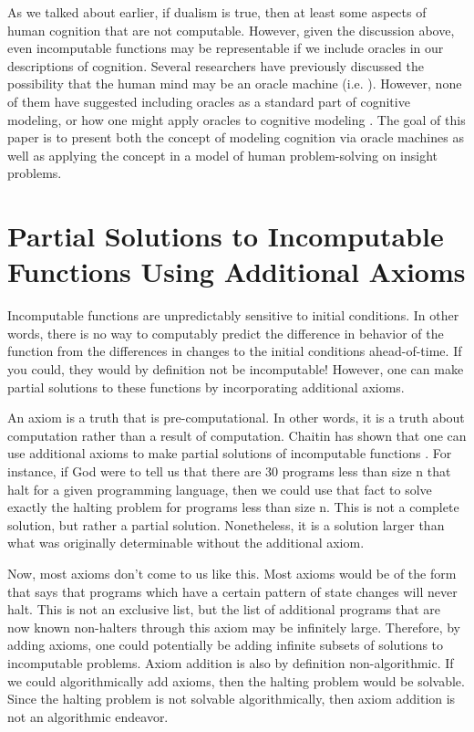 As we talked about earlier, if dualism is true, then at least some aspects of human cognition that are not computable.  However, given the discussion above, even incomputable functions may be representable if we include oracles in our descriptions of cognition.  Several researchers have previously discussed the possibility that the human mind may be an oracle machine (i.e. \citet{copeland1998}).  However, none of them have suggested including oracles as a standard part of cognitive modeling, or how one might apply oracles to cognitive modeling \citep{bartlett2010a, bartlett2010b}. The goal of this paper is to present both the concept of modeling cognition via oracle machines as well as applying the concept in a model of human problem-solving on insight problems.

\section[Partial Solutions to Incomputable Functions]{Partial Solutions to Incomputable Functions Using Additional Axioms}

Incomputable functions are unpredictably sensitive to initial conditions.  In other words, there is no way to computably predict the difference in behavior of the function from the differences in changes to the initial conditions ahead-of-time.  If you could, they would by definition not be incomputable!  However, one can make partial solutions to these functions by incorporating additional axioms.

An axiom is a truth that is pre-computational.  In other words, it is a truth about computation rather than a result of computation.  Chaitin has shown that one can use additional axioms to make partial solutions of incomputable functions \citep{chaitin1982}.  For instance, if God were to tell us that there are 30 programs less than size n that halt for a given programming language, then we could use that fact to solve exactly the halting problem for programs less than size n.  This is not a complete solution, but rather a partial solution.  Nonetheless, it is a solution larger than what was originally determinable without the additional axiom.

Now, most axioms don't come to us like this.  Most axioms would be of the form that says that programs which have a certain pattern of state changes will never halt.  This is not an exclusive list, but the list of additional programs that are now known non-halters through this axiom may be infinitely large.  Therefore, by adding axioms, one could potentially be adding infinite subsets of solutions to incomputable problems.  Axiom addition is also by definition non-algorithmic.  If we could algorithmically add axioms, then the halting problem would be solvable.  Since the halting problem is not solvable algorithmically, then axiom addition is not an algorithmic endeavor.

